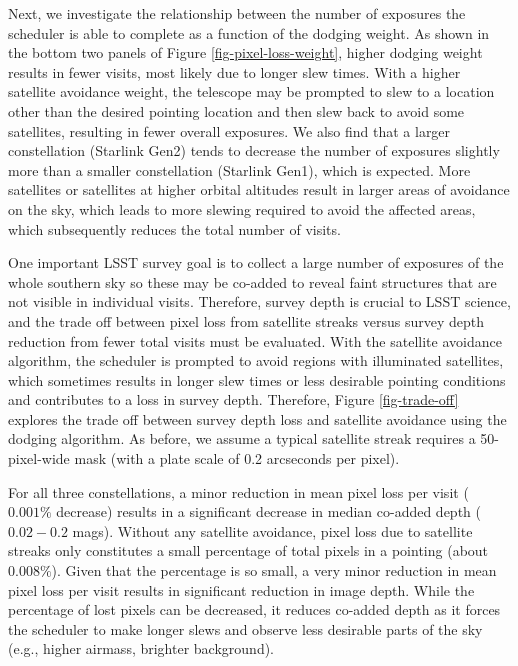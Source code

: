 \documentclass[twocolumn]{aastex631}
\begin{document}
Next, we investigate the relationship between the number of exposures the scheduler is able to complete as a function of the dodging weight. As shown in the bottom two panels of Figure \ref{fig-pixel-loss-weight}, higher dodging weight results in fewer visits, most likely due to longer slew times. With a higher satellite avoidance weight, the telescope may be prompted to slew to a location other than the desired pointing location and then slew back to avoid some satellites, resulting in fewer overall exposures. We also find that a larger constellation (Starlink Gen2) tends to decrease the number of exposures slightly more than a smaller constellation (Starlink Gen1), which is expected. More satellites or satellites at higher orbital altitudes result in larger areas of avoidance on the sky, which leads to more slewing required to avoid the affected areas, which subsequently reduces the total number of visits.

One important LSST survey goal is to collect a large number of exposures of the whole southern sky so these may be co-added to reveal faint structures that are not visible in individual visits. Therefore, survey depth is crucial to LSST science, and the trade off between pixel loss from satellite streaks versus survey depth reduction from fewer total visits must be evaluated. With the satellite avoidance algorithm, the scheduler is prompted to avoid regions with illuminated satellites, which sometimes results in longer slew times or less desirable pointing conditions and contributes to a loss in survey depth. Therefore, Figure \ref{fig-trade-off} explores the trade off between survey depth loss and satellite avoidance using the dodging algorithm. As before, we assume a typical satellite streak requires a 50-pixel-wide mask (with a plate scale of 0.2 arcseconds per pixel).

For all three constellations, a minor reduction in mean pixel loss per visit ($0.001\%$ decrease) results in a significant decrease in median co-added depth ($0.02-0.2$ mags). Without any satellite avoidance, pixel loss due to satellite streaks only constitutes a small percentage of total pixels in a pointing (about $0.008\%$). Given that the percentage is so small, a very minor reduction in mean pixel loss per visit results in significant reduction in image depth. While the percentage of lost pixels can be decreased, it reduces co-added depth as it forces the scheduler to make longer slews and observe less desirable parts of the sky (e.g., higher airmass, brighter background).
\end{document}
